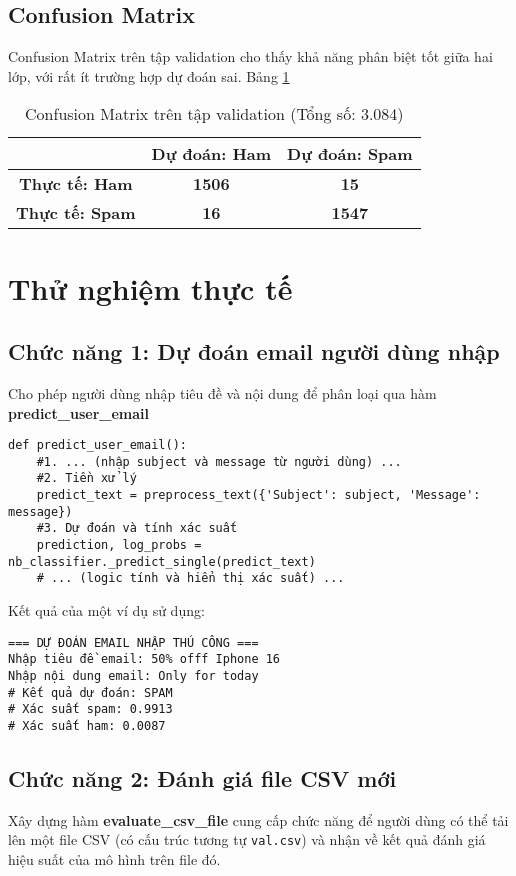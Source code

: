 \subsection{Confusion Matrix}
Confusion Matrix trên tập validation cho thấy khả năng phân biệt tốt giữa hai lớp, với rất ít trường hợp dự đoán sai. Bảng \ref{fig:confusion_matrix}

\begin{table}[H]
\centering
\begin{tabular}{|c|c|c|}
\hline
& \textbf{Dự đoán: Ham} & \textbf{Dự đoán: Spam} \\
\hline
\textbf{Thực tế: Ham} & \textbf{1506} & \textbf{15} \\
\hline
\textbf{Thực tế: Spam} & \textbf{16} & \textbf{1547} \\
\hline
\end{tabular}
\caption{Confusion Matrix trên tập validation (Tổng số: 3.084)}
\label{fig:confusion_matrix}
\end{table}

\section{Thử nghiệm thực tế}

\subsection{Chức năng 1: Dự đoán email người dùng nhập}
Cho phép người dùng nhập tiêu đề và nội dung để phân loại qua hàm \textbf{predict\_user\_email}
\begin{verbatim}
def predict_user_email():
    #1. ... (nhập subject và message từ người dùng) ...
    #2. Tiền xử lý
    predict_text = preprocess_text({'Subject': subject, 'Message': message})
    #3. Dự đoán và tính xác suất
    prediction, log_probs = nb_classifier._predict_single(predict_text)
    # ... (logic tính và hiển thị xác suất) ...
\end{verbatim}

Kết quả của một ví dụ sử dụng:
\begin{verbatim}
=== DỰ ĐOÁN EMAIL NHẬP THỦ CÔNG ===
Nhập tiêu đề email: 50% offf Iphone 16
Nhập nội dung email: Only for today
# Kết quả dự đoán: SPAM
# Xác suất spam: 0.9913
# Xác suất ham: 0.0087
\end{verbatim}

\subsection{Chức năng 2: Đánh giá file CSV mới}
Xây dựng hàm \textbf{evaluate\_csv\_file} cung cấp chức năng để người dùng có thể tải lên một file CSV (có cấu trúc tương tự \texttt{val.csv}) và nhận về kết quả đánh giá hiệu suất của mô hình trên file đó.

